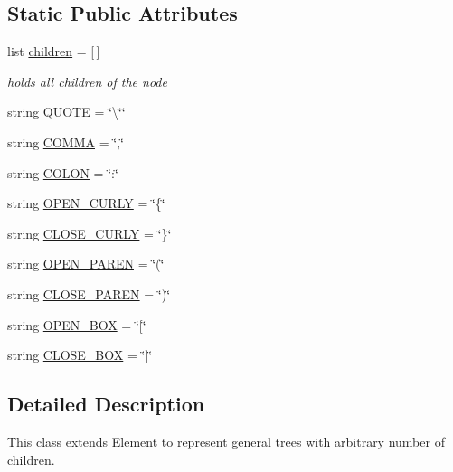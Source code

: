 \subsection*{Static Public Attributes}
\begin{DoxyCompactItemize}
\item 
list \hyperlink{class_bridges_1_1_tree_element_1_1_tree_element_afdfe8877a4c29b5e4f8e983f176dd5de}{children} = \mbox{[}$\,$\mbox{]}
\begin{DoxyCompactList}\small\item\em holds all children of the node \end{DoxyCompactList}\item 
string \hyperlink{class_bridges_1_1_tree_element_1_1_tree_element_a9c4b0517bdd82b0f000c818ced4733c3}{Q\+U\+O\+T\+E} = \char`\"{}\textbackslash{}\char`\"{}\char`\"{}
\item 
string \hyperlink{class_bridges_1_1_tree_element_1_1_tree_element_aa0ec60ed2fefb6150c5c740545d3f39b}{C\+O\+M\+M\+A} = \char`\"{},\char`\"{}
\item 
string \hyperlink{class_bridges_1_1_tree_element_1_1_tree_element_a66dd123566230bda0032e0608822fbe1}{C\+O\+L\+O\+N} = \char`\"{}\+:\char`\"{}
\item 
string \hyperlink{class_bridges_1_1_tree_element_1_1_tree_element_a38e2f86ce23fcdf63c1c252c94fbe563}{O\+P\+E\+N\+\_\+\+C\+U\+R\+L\+Y} = \char`\"{}\{\char`\"{}
\item 
string \hyperlink{class_bridges_1_1_tree_element_1_1_tree_element_a063039c1da36ba93e7c5050d564cdd01}{C\+L\+O\+S\+E\+\_\+\+C\+U\+R\+L\+Y} = \char`\"{}\}\char`\"{}
\item 
string \hyperlink{class_bridges_1_1_tree_element_1_1_tree_element_a7fdab53f2a56df22ca48438a170563d4}{O\+P\+E\+N\+\_\+\+P\+A\+R\+E\+N} = \char`\"{}(\char`\"{}
\item 
string \hyperlink{class_bridges_1_1_tree_element_1_1_tree_element_a9af9144b58174fde286a56faaf89b7de}{C\+L\+O\+S\+E\+\_\+\+P\+A\+R\+E\+N} = \char`\"{})\char`\"{}
\item 
string \hyperlink{class_bridges_1_1_tree_element_1_1_tree_element_af223bc329cbb1b41ec8c1714b1feca4d}{O\+P\+E\+N\+\_\+\+B\+O\+X} = \char`\"{}\mbox{[}\char`\"{}
\item 
string \hyperlink{class_bridges_1_1_tree_element_1_1_tree_element_a044bbe06d6a6c0f87cea8e26add386d5}{C\+L\+O\+S\+E\+\_\+\+B\+O\+X} = \char`\"{}\mbox{]}\char`\"{}
\end{DoxyCompactItemize}


\subsection{Detailed Description}
This class extends \hyperlink{namespace_bridges_1_1_element}{Element} to represent general trees with arbitrary number of children. 

